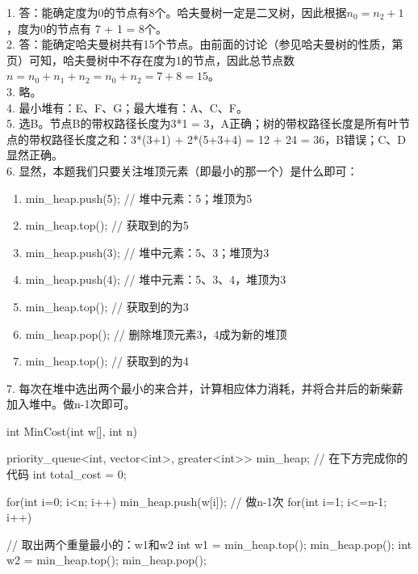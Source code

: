 \begin{exerciseanswer}
    1. 答：能确定度为0的节点有8个。哈夫曼树一定是二叉树，因此根据$n_0=n_2+1$，度为0的节点有 7 + 1 = 8个。\\

    2. 答：能确定哈夫曼树共有15个节点。由前面的讨论（参见哈夫曼树的性质，第\pageref{minisec:哈夫曼树的性质}页）可知，哈夫曼树中不存在度为1的节点，因此总节点数
    $n = n_0 + n_1 + n_2 = n_0 + n_2 = 7 + 8 = 15$。\\

    3. 略。\\

    4. 最小堆有：E、F、G；最大堆有：A、C、F。\\

    5. 选B。节点B的带权路径长度为3*1 = 3，A正确；树的带权路径长度是所有叶节点的带权路径长度之和：3*(3+1) + 2*(5+3+4) = 12 + 24 = 36，B错误；C、D显然正确。\\

    6. 显然，本题我们只要关注堆顶元素（即最小的那一个）是什么即可：
    \begin{enumerate}[label=\arabic*）]
        \item min\_heap.push(5);  // 堆中元素：5；堆顶为5
        \item min\_heap.top();    // 获取到的为5
        \item min\_heap.push(3);  // 堆中元素：5、3；堆顶为3
        \item min\_heap.push(4);  // 堆中元素：5、3、4，堆顶为3
        \item min\_heap.top();    // 获取到的为3
        \item min\_heap.pop();    // 删除堆顶元素3，4成为新的堆顶
        \item min\_heap.top();    // 获取到的为4
    \end{enumerate}

    \vspace{\baselineskip}

    7. 每次在堆中选出两个最小的来合并，计算相应体力消耗，并将合并后的新柴薪加入堆中。做n-1次即可。
    \begin{cppcode}
        int MinCost(int w[], int n) {
            priority_queue<int, vector<int>, greater<int>> min_heap;      
            // 在下方完成你的代码
            int total_cost = 0;
            
            for(int i=0; i<n; i++) {
                min_heap.push(w[i]);
            }
            // 做n-1次
            for(int i=1; i<=n-1; i++) {
                // 取出两个重量最小的：w1和w2
                int w1 = min_heap.top();
                min_heap.pop();
                int w2 = min_heap.top();
                min_heap.pop();

}}
\end{cppcode}
\end{exerciseanswer}
